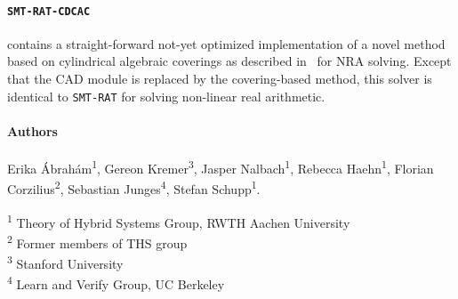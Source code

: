 \documentclass{article}
\begin{document}
\paragraph{\texttt{SMT-RAT-CDCAC}} contains a straight-forward not-yet optimized implementation of a novel method based on cylindrical algebraic coverings as described in~\cite{Abraham2020} for NRA solving. Except that the CAD module is replaced by the covering-based method, this solver is identical to \texttt{SMT-RAT} for solving non-linear real arithmetic.

\paragraph{Authors}

Erika \'Abrah\'am\textsuperscript{1},
Gereon Kremer\textsuperscript{3},
Jasper Nalbach\textsuperscript{1},
Rebecca Haehn\textsuperscript{1},
Florian Corzilius\textsuperscript{2},
Sebastian Junges\textsuperscript{4},
Stefan Schupp\textsuperscript{1}.

\noindent
\textsuperscript{1} Theory of Hybrid Systems Group, RWTH Aachen University \\
\textsuperscript{2} Former members of THS group \\
\textsuperscript{3} Stanford University \\
\textsuperscript{4} Learn and Verify Group, UC Berkeley
\newpage



\end{document}
